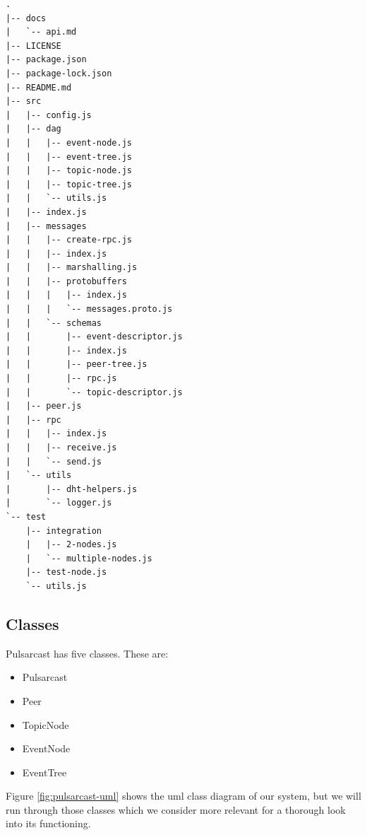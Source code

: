 \begin{lstlisting}[float, caption={File tree for our Pulsarcast implementation},label={file-tree}]
.
|-- docs
|   `-- api.md
|-- LICENSE
|-- package.json
|-- package-lock.json
|-- README.md
|-- src
|   |-- config.js
|   |-- dag
|   |   |-- event-node.js
|   |   |-- event-tree.js
|   |   |-- topic-node.js
|   |   |-- topic-tree.js
|   |   `-- utils.js
|   |-- index.js
|   |-- messages
|   |   |-- create-rpc.js
|   |   |-- index.js
|   |   |-- marshalling.js
|   |   |-- protobuffers
|   |   |   |-- index.js
|   |   |   `-- messages.proto.js
|   |   `-- schemas
|   |       |-- event-descriptor.js
|   |       |-- index.js
|   |       |-- peer-tree.js
|   |       |-- rpc.js
|   |       `-- topic-descriptor.js
|   |-- peer.js
|   |-- rpc
|   |   |-- index.js
|   |   |-- receive.js
|   |   `-- send.js
|   `-- utils
|       |-- dht-helpers.js
|       `-- logger.js
`-- test
    |-- integration
    |   |-- 2-nodes.js
    |   `-- multiple-nodes.js
    |-- test-node.js
    `-- utils.js

\end{lstlisting}

\subsection{Classes}\label{subsec:classes}

Pulsarcast has five classes. These are:

\begin{itemize}
  \item
    Pulsarcast
  \item
		Peer
  \item
    TopicNode
  \item
    EventNode
  \item
    EventTree
\end{itemize}

Figure \ref{fig:pulsarcast-uml} shows the \acrfull{uml} class diagram of our
system, but we will run through those classes which we consider more relevant
for a thorough look into its functioning.

